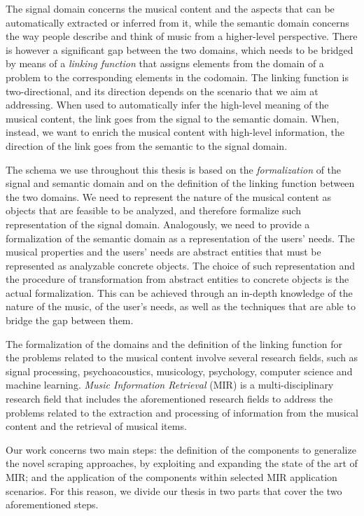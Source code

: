 The signal domain concerns the musical content and the aspects that can be automatically extracted or inferred from it, while the semantic domain concerns the way people describe and think of music from a higher-level perspective. There is however a significant gap between the two domains, which needs to be bridged by means of a \textit{linking function} that assigns elements from the domain of a problem to the corresponding elements in the codomain. The linking function is two-directional, and its direction depends on the scenario that we aim at addressing. When used to automatically infer the high-level meaning of the musical content, the link goes from the signal to the semantic domain. When, instead, we want to enrich the musical content with high-level information, the direction of the link goes from the semantic to the signal domain.


The schema we use throughout this thesis is based on the \textit{formalization} of the signal and semantic domain and on the definition of the linking function between the two domains. We need to represent the nature of the musical content as objects that are feasible to be analyzed, and therefore formalize such representation of the signal domain. Analogously, we need to provide a formalization of the semantic domain as a representation of the users' needs. The musical properties and the users' needs are abstract entities that must be represented as analyzable concrete objects. The choice of such representation and the procedure of transformation from abstract entities to concrete objects is the actual formalization. This can be achieved through an in-depth knowledge of the nature of the music, of the user's needs, as well as the techniques that are able to bridge the gap between them. 

The formalization of the domains and the definition of the linking function for the problems related to the musical content involve several research fields, such as signal processing, psychoacoustics, musicology, psychology, computer science and machine learning. \textit{Music Information Retrieval} (MIR) \cite{muller2007information} is a multi-disciplinary research field that includes the aforementioned research fields to address the problems related to the extraction and processing of information from the musical content and the retrieval of musical items. 

Our work concerns two main steps: the definition of the components to generalize the novel scraping approaches, by exploiting and expanding the state of the art of MIR; and the application of the components within selected MIR application scenarios. For this reason, we divide our thesis in two parts that cover the two aforementioned steps. 


